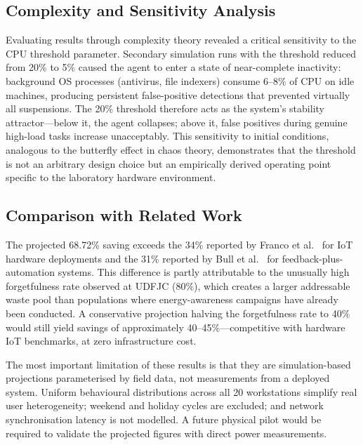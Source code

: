 \documentclass[conference]{IEEEtran}
\begin{document}
\subsection{Complexity and Sensitivity Analysis}

Evaluating results through complexity theory revealed a critical sensitivity to the CPU threshold parameter. Secondary simulation runs with the threshold reduced from 20\% to 5\% caused the agent to enter a state of near-complete inactivity: background OS processes (antivirus, file indexers) consume 6–8\% of CPU on idle machines, producing persistent false-positive detections that prevented virtually all suspensions. The 20\% threshold therefore acts as the system's stability attractor—below it, the agent collapses; above it, false positives during genuine high-load tasks increase unacceptably. This sensitivity to initial conditions, analogous to the butterfly effect in chaos theory, demonstrates that the threshold is not an arbitrary design choice but an empirically derived operating point specific to the laboratory hardware environment.

\subsection{Comparison with Related Work}

The projected 68.72\% saving exceeds the 34\% reported by Franco et al.~\cite{franco2025} for IoT hardware deployments and the 31\% reported by Bull et al.~\cite{bull2018} for feedback-plus-automation systems. This difference is partly attributable to the unusually high forgetfulness rate observed at UDFJC (80\%), which creates a larger addressable waste pool than populations where energy-awareness campaigns have already been conducted. A conservative projection halving the forgetfulness rate to 40\% would still yield savings of approximately 40–45\%—competitive with hardware IoT benchmarks, at zero infrastructure cost.

The most important limitation of these results is that they are simulation-based projections parameterised by field data, not measurements from a deployed system. Uniform behavioural distributions across all 20 workstations simplify real user heterogeneity; weekend and holiday cycles are excluded; and network synchronisation latency is not modelled. A future physical pilot would be required to validate the projected figures with direct power measurements.

\end{document}
